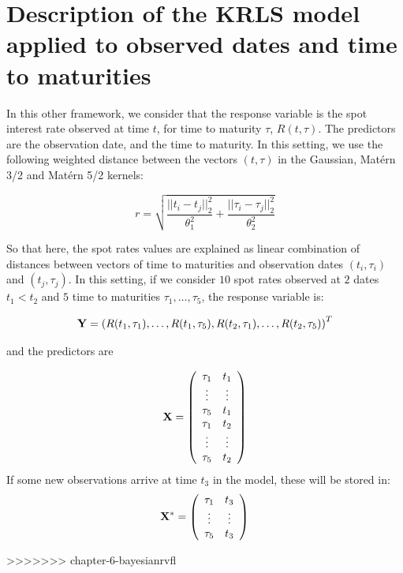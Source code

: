 \section{Description of the KRLS model applied to observed dates and time to maturities}
\label{sec:purekrls}

In this other framework, we consider that the response variable is the spot interest rate observed at time $t$, for time to maturity $\tau$, $R(t, \tau)$. The predictors are the observation date, and the time to maturity. In this setting, we use the following weighted distance between the vectors $(t, \tau)$ in the Gaussian, Mat\'ern 3/2 and Mat\'ern 5/2 kernels:

$$
r = \sqrt{\frac{||t_i - t_j||^2_2}{\theta_1^2} + \frac{||\tau_i - \tau_j||^2_2}{\theta_2^2}}
$$

So that here, the spot rates values are explained as linear combination of distances between vectors of  time to maturities and observation dates $(t_i, \tau_i)$ and $(t_j, \tau_j)$. In this setting, if we consider $10$ spot rates observed at $2$ dates $t_1 < t_2$ and $5$ time to maturities $\tau_1, \ldots, \tau_5$, the response variable is:

$$
{\bf Y} = \left(R(t_1, \tau_1), \ldots, R(t_1, \tau_5), R(t_2, \tau_1), \ldots, R(t_2, \tau_5)\right)^T
$$

and the predictors are 

$$
{\bf X} = \left( {\begin{array}{cc} \tau_1 &  t_1\\
                          \vdots & \vdots\\
                          \tau_5 &  t_1\\
                          \tau_1 &  t_2\\
                          \vdots & \vdots\\
                          \tau_5 &  t_2\\
       \end{array} } \right)
$$
If some new observations arrive at time $t_3$ in the model, these will be stored in: 
$$
{\bf X}^* = \left( {\begin{array}{cc} \tau_1 &  t_3\\
                          \vdots & \vdots\\
                          \tau_5 &  t_3\\
       \end{array} } \right)
$$

>>>>>>> chapter-6-bayesianrvfl

